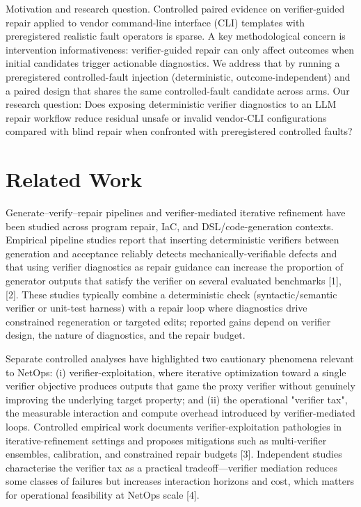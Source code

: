 \documentclass[conference]{IEEEtran}
\begin{document}
Motivation and research question. Controlled paired evidence on verifier-guided repair applied to vendor command-line interface (CLI) templates with preregistered realistic fault operators is sparse. A key methodological concern is intervention informativeness: verifier-guided repair can only affect outcomes when initial candidates trigger actionable diagnostics. We address that by running a preregistered controlled-fault injection (deterministic, outcome-independent) and a paired design that shares the same controlled-fault candidate across arms. Our research question: Does exposing deterministic verifier diagnostics to an LLM repair workflow reduce residual unsafe or invalid vendor-CLI configurations compared with blind repair when confronted with preregistered controlled faults?

\section{Related Work}
Generate--verify--repair pipelines and verifier-mediated iterative refinement have been studied across program repair, IaC, and DSL/code-generation contexts. Empirical pipeline studies report that inserting deterministic verifiers between generation and acceptance reliably detects mechanically-verifiable defects and that using verifier diagnostics as repair guidance can increase the proportion of generator outputs that satisfy the verifier on several evaluated benchmarks [1], [2]. These studies typically combine a deterministic check (syntactic/semantic verifier or unit-test harness) with a repair loop where diagnostics drive constrained regeneration or targeted edits; reported gains depend on verifier design, the nature of diagnostics, and the repair budget.

Separate controlled analyses have highlighted two cautionary phenomena relevant to NetOps: (i) verifier-exploitation, where iterative optimization toward a single verifier objective produces outputs that game the proxy verifier without genuinely improving the underlying target property; and (ii) the operational "verifier tax", the measurable interaction and compute overhead introduced by verifier-mediated loops. Controlled empirical work documents verifier-exploitation pathologies in iterative-refinement settings and proposes mitigations such as multi-verifier ensembles, calibration, and constrained repair budgets [3]. Independent studies characterise the verifier tax as a practical tradeoff---verifier mediation reduces some classes of failures but increases interaction horizons and cost, which matters for operational feasibility at NetOps scale [4].
\end{document}

